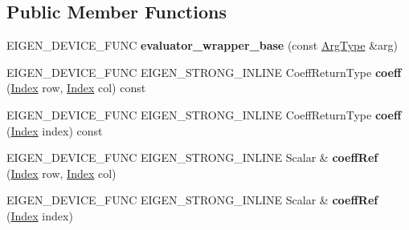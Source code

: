 \subsection*{Public Member Functions}
\begin{DoxyCompactItemize}
\item 
\mbox{\label{struct_eigen_1_1internal_1_1evaluator__wrapper__base_a529c1380dce98ac43ff335c41fe3b314}} 
E\+I\+G\+E\+N\+\_\+\+D\+E\+V\+I\+C\+E\+\_\+\+F\+U\+NC {\bfseries evaluator\+\_\+wrapper\+\_\+base} (const \hyperlink{group___sparse_core___module}{Arg\+Type} \&arg)
\item 
\mbox{\label{struct_eigen_1_1internal_1_1evaluator__wrapper__base_ae4c999dc0fa9425f31a223fd9528626e}} 
E\+I\+G\+E\+N\+\_\+\+D\+E\+V\+I\+C\+E\+\_\+\+F\+U\+NC E\+I\+G\+E\+N\+\_\+\+S\+T\+R\+O\+N\+G\+\_\+\+I\+N\+L\+I\+NE Coeff\+Return\+Type {\bfseries coeff} (\hyperlink{namespace_eigen_a62e77e0933482dafde8fe197d9a2cfde}{Index} row, \hyperlink{namespace_eigen_a62e77e0933482dafde8fe197d9a2cfde}{Index} col) const
\item 
\mbox{\label{struct_eigen_1_1internal_1_1evaluator__wrapper__base_addbd1d2f5c426bfc7b64ff449d6c23a4}} 
E\+I\+G\+E\+N\+\_\+\+D\+E\+V\+I\+C\+E\+\_\+\+F\+U\+NC E\+I\+G\+E\+N\+\_\+\+S\+T\+R\+O\+N\+G\+\_\+\+I\+N\+L\+I\+NE Coeff\+Return\+Type {\bfseries coeff} (\hyperlink{namespace_eigen_a62e77e0933482dafde8fe197d9a2cfde}{Index} index) const
\item 
\mbox{\label{struct_eigen_1_1internal_1_1evaluator__wrapper__base_ae15e7475c7d4638e8f1229570d468421}} 
E\+I\+G\+E\+N\+\_\+\+D\+E\+V\+I\+C\+E\+\_\+\+F\+U\+NC E\+I\+G\+E\+N\+\_\+\+S\+T\+R\+O\+N\+G\+\_\+\+I\+N\+L\+I\+NE Scalar \& {\bfseries coeff\+Ref} (\hyperlink{namespace_eigen_a62e77e0933482dafde8fe197d9a2cfde}{Index} row, \hyperlink{namespace_eigen_a62e77e0933482dafde8fe197d9a2cfde}{Index} col)
\item 
\mbox{\label{struct_eigen_1_1internal_1_1evaluator__wrapper__base_ad5084d136cbf11ea3b7e085a3de3244e}} 
E\+I\+G\+E\+N\+\_\+\+D\+E\+V\+I\+C\+E\+\_\+\+F\+U\+NC E\+I\+G\+E\+N\+\_\+\+S\+T\+R\+O\+N\+G\+\_\+\+I\+N\+L\+I\+NE Scalar \& {\bfseries coeff\+Ref} (\hyperlink{namespace_eigen_a62e77e0933482dafde8fe197d9a2cfde}{Index} index)

\end{DoxyCompactItemize}

